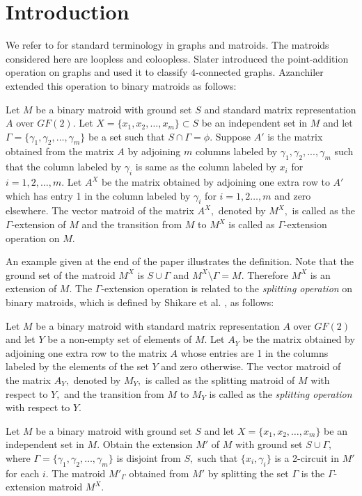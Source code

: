 \documentclass[
11pt,%
tightenlines,%
twoside,%
onecolumn,%
nofloats,%
nobibnotes,%
nofootinbib,%
superscriptaddress,%
noshowpacs,%
centertags]%
{revtex4}
\begin{document}
\section{Introduction}
 We refer to \cite {ox} for standard terminology in graphs
 and matroids. The matroids considered here are loopless and coloopless.
 Slater \cite{sl} introduced the point-addition operation on graphs and used it to classify $4$-connected graphs.
  Azanchiler \cite{a1} extended this operation to  binary matroids as follows:
 \begin{definition} \cite{a1}  Let $M$ be a binary matroid with ground set $S$ and
 standard matrix representation $A$ over $GF(2).$ Let $X = \{x_1, x_2, \dots, x_m\} \subset S$ be
  an independent set in $M$ and let $\Gamma = \{\gamma_{1}, \gamma_{2}, \dots, \gamma_{m}\}$ be
  a set such that $ S \cap \Gamma = \phi.$    Suppose  $A'$ is  the matrix obtained from the
   matrix $A$ by adjoining $m$ columns  labeled by $\gamma_{1}, \gamma_{2},...,\gamma_{m}$ such
   that the column labeled by $\gamma_{i}$
is same as the column labeled by $x_i$ for $ i =1, 2, \dots, m.$ Let $A^X$ be
the matrix obtained by adjoining one extra row to  $A'$ which has entry 1 in the column
labeled by $\gamma_{i}$ for $i= 1, 2 \dots, m$  and zero elsewhere. The  vector matroid of
 the matrix $A^{X},$ denoted by $M^{X},$  is called as the $\Gamma$-extension of $M$ and the
 transition from $M$ to $M^{X}$ is called as $\Gamma$-extension operation on $M.$
\end{definition}


An example given at the end of the paper illustrates the definition.
Note that the ground set of the matroid $M^{X}$ is $S\cup \Gamma$
and  $M^X\setminus \Gamma  = M.$ Therefore $M^X$ is an extension of
$M.$   The $\Gamma$-extension operation is related to the {\it
splitting operation}  on binary matroids, which is defined by
Shikare et al. \cite{saw}, as follows:
\begin{definition} \cite{saw}  Let $M$ be a binary matroid with
standard matrix representation $A$ over  $GF(2)$ and let $Y$ be
a non-empty set of elements of $M.$  Let $A_Y$ be the matrix  obtained
by adjoining one extra row to the matrix $A$ whose entries are 1 in the columns
labeled by the elements of the set $Y$ and zero otherwise.  The vector matroid
of the matrix $A_Y,$ denoted by $M_Y,$  is called as the splitting matroid of
 $M$ with respect to $Y,$ and the  transition from $M$ to $M_{Y}$ is called as
  the {\it splitting operation} with respect to $Y.$
 \end{definition}
 Let $M$ be a binary matroid with ground set $S$ and let
 $X = \{x_1, x_2, \dots, x_m\}$  be an independent set in $M.$ Obtain
 the extension $M'$ of $M$ with ground set $S \cup \Gamma,$
 where $\Gamma = \{\gamma_1, \gamma_2, \dots, \gamma_m\}$ is disjoint
 from $S,$ such that  $\{x_i, \gamma_i\}$ is a 2-circuit in $M'$ for
 each $i.$ The matroid $M'_{\Gamma}$ obtained from $M'$ by splitting the
  set $\Gamma$  is the $\Gamma$-extension matroid $M^X.$
\end{document}

